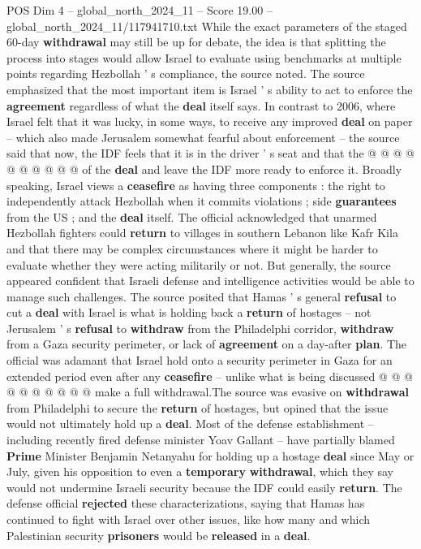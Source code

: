 \begin{textsample}{POS Dim 4 – global\_north\_2024\_11 – Score 19.00 – global\_north\_2024\_11/117941710.txt}
While the exact parameters of the staged 60-day \textbf{withdrawal} may still be up for debate, the idea is that splitting the process into stages would allow Israel to evaluate using benchmarks at multiple points regarding Hezbollah ' s compliance, the source noted.
The source emphasized that the most important item is Israel ' s ability to act to enforce the \textbf{agreement} regardless of what the \textbf{deal} itself says.
In contrast to 2006, where Israel felt that it was lucky, in some ways, to receive any improved \textbf{deal} on paper -- which also made Jerusalem somewhat fearful about enforcement -- the source said that now, the IDF feels that it is in the driver ' s seat and that the @ @ @ @ @ @ @ @ @ @ of the \textbf{deal} and leave the IDF more ready to enforce it.
Broadly speaking, Israel views a \textbf{ceasefire} as having three components : the right to independently attack Hezbollah when it commits violations ; side \textbf{guarantees} from the US ; and the \textbf{deal} itself.
The official acknowledged that unarmed Hezbollah fighters could \textbf{return} to villages in southern Lebanon like Kafr Kila and that there may be complex circumstances where it might be harder to evaluate whether they were acting militarily or not.
But generally, the source appeared confident that Israeli defense and intelligence activities would be able to manage such challenges.
The source posited that Hamas ' s general \textbf{refusal} to cut a \textbf{deal} with Israel is what is holding back a \textbf{return} of hostages -- not Jerusalem ' s \textbf{refusal} to \textbf{withdraw} from the Philadelphi corridor, \textbf{withdraw} from a Gaza security perimeter, or lack of \textbf{agreement} on a day-after \textbf{plan}.
The official was adamant that Israel hold onto a security perimeter in Gaza for an extended period even after any \textbf{ceasefire} -- unlike what is being discussed @ @ @ @ @ @ @ @ @ @ make a full withdrawal.The source was evasive on \textbf{withdrawal} from Philadelphi to secure the \textbf{return} of hostages, but opined that the issue would not ultimately hold up a \textbf{deal}.
Most of the defense establishment -- including recently fired defense minister Yoav Gallant -- have partially blamed \textbf{Prime} Minister Benjamin Netanyahu for holding up a hostage \textbf{deal} since May or July, given his opposition to even a \textbf{temporary} \textbf{withdrawal}, which they say would not undermine Israeli security because the IDF could easily \textbf{return}.
The defense official \textbf{rejected} these characterizations, saying that Hamas has continued to fight with Israel over other issues, like how many and which Palestinian security \textbf{prisoners} would be \textbf{released} in a \textbf{deal}.

\end{textsample}
